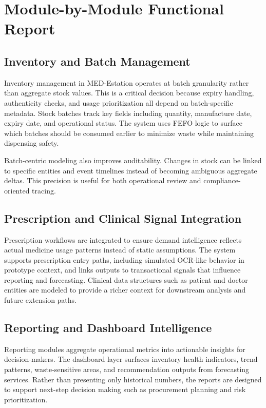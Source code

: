 \documentclass[12pt,a4paper]{article}
\begin{document}
\section{Module-by-Module Functional Report}
\subsection{Inventory and Batch Management}
Inventory management in MED-Estation operates at batch granularity rather than aggregate stock values. This is a critical decision because expiry handling, authenticity checks, and usage prioritization all depend on batch-specific metadata. Stock batches track key fields including quantity, manufacture date, expiry date, and operational status. The system uses FEFO logic to surface which batches should be consumed earlier to minimize waste while maintaining dispensing safety.

Batch-centric modeling also improves auditability. Changes in stock can be linked to specific entities and event timelines instead of becoming ambiguous aggregate deltas. This precision is useful for both operational review and compliance-oriented tracing.

\subsection{Prescription and Clinical Signal Integration}
Prescription workflows are integrated to ensure demand intelligence reflects actual medicine usage patterns instead of static assumptions. The system supports prescription entry paths, including simulated OCR-like behavior in prototype context, and links outputs to transactional signals that influence reporting and forecasting. Clinical data structures such as patient and doctor entities are modeled to provide a richer context for downstream analysis and future extension paths.

\subsection{Reporting and Dashboard Intelligence}
Reporting modules aggregate operational metrics into actionable insights for decision-makers. The dashboard layer surfaces inventory health indicators, trend patterns, waste-sensitive areas, and recommendation outputs from forecasting services. Rather than presenting only historical numbers, the reports are designed to support next-step decision making such as procurement planning and risk prioritization.
\end{document}
